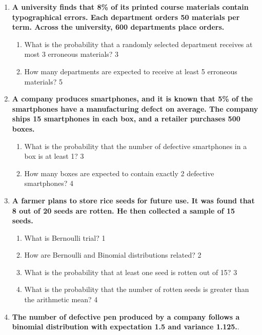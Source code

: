 \documentclass[a4paper,oneside, margin=1.4in]{book}
\begin{document}
\begin{enumerate}
  
  \item  
  \textbf{A university finds that 8\% of its printed course materials contain typographical errors. Each department orders 50 materials per term. Across the university, 600 departments place orders.}  

  \begin{enumerate}  
    \item  
      What is the probability that a randomly selected department receives at most 3 erroneous materials? \hfill 3  
    \item  
      How many departments are expected to receive at least 5 erroneous materials? \hfill 5  
  \end{enumerate}

  
  \item
	  \textbf{A company produces smartphones, and it is known that 5\% of the 
	  smartphones have a manufacturing defect on average. The company ships 15 
	  smartphones in each box, and a retailer purchases 500 boxes.} 
  
  \begin{enumerate}
    \item  
	What is the probability that the number of defective smartphones in a box 
	is at least 1? \hfill 3
    \item
	How many boxes are expected to contain exactly 2 defective smartphones? \hfill 4
  \end{enumerate}

  
 \item
	  \textbf{A farmer plans to store rice seeds for future use. It was found 
	  that 8 out of 20 seeds are rotten. He then collected a sample of 15 seeds.} 
  
  \begin{enumerate}
    \item
	What is Bernoulli trial? \hfill 1
    \item
	How are Bernoulli and Binomial distributions related? \hfill 2
    \item  
	What is the probability that at least one seed is rotten out of 15? \hfill 3
    \item
	What is the probability that the number of rotten seeds is greater than the arithmetic mean? \hfill 4
  \end{enumerate}

 \item
	  \textbf{The number of defective pen produced by a company follows a 
	  binomial distribution with expectation 1.5 and variance 1.125.}. 
  

\end{enumerate}
\end{document}
